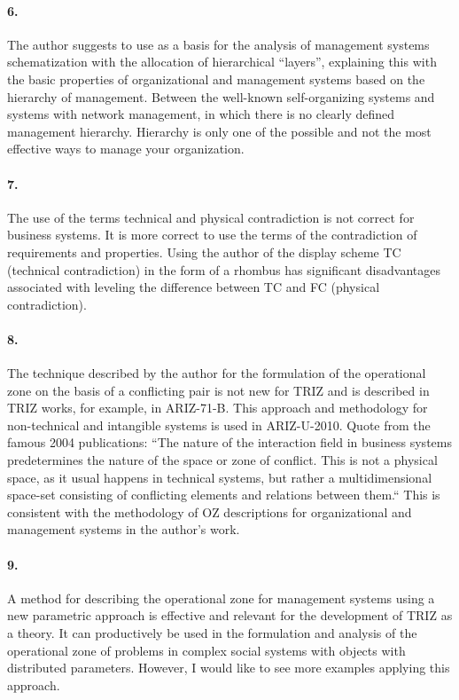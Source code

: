 \paragraph{6.}
The author suggests to use as a basis for the analysis of management systems
schematization with the allocation of hierarchical “layers”, explaining this
with the basic properties of organizational and management systems based on
the hierarchy of management. Between the well-known self-organizing systems
and systems with network management, in which there is no clearly defined
management hierarchy. Hierarchy is only one of the possible and not the most
effective ways to manage your organization.

\paragraph{7.}
The use of the terms technical and physical contradiction is not correct for
business systems. It is more correct to use the terms of the contradiction of
requirements and properties. Using the author of the display scheme TC
(technical contradiction) in the form of a rhombus has significant
disadvantages associated with leveling the difference between TC and FC
(physical contradiction).

\paragraph{8.}
The technique described by the author for the formulation of the operational
zone on the basis of a conflicting pair is not new for TRIZ and is described
in TRIZ works, for example, in ARIZ-71-B. This approach and methodology for
non-technical and intangible systems is used in ARIZ-U-2010. Quote from the
famous 2004 publications: “The nature of the interaction field in business
systems predetermines the nature of the space or zone of conflict. This is not
a physical space, as it usual happens in technical systems, but rather a
multidimensional space-set consisting of conflicting elements and relations
between them.“ This is consistent with the methodology of OZ descriptions for
organizational and management systems in the author's work.

\paragraph{9.}
A method for describing the operational zone for management systems using a
new parametric approach is effective and relevant for the development of TRIZ
as a theory. It can productively be used in the formulation and analysis of
the operational zone of problems in complex social systems with objects with
distributed parameters. However, I would like to see more examples applying
this approach.

